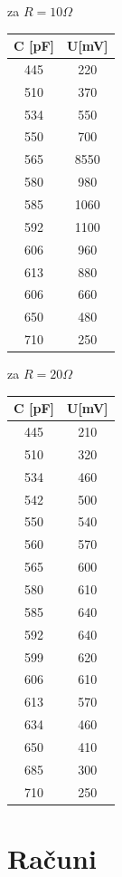 \documentclass[a4paper]{report}
\begin{document}
za $R = 10 \Omega$
\begin{center}
	\begin{tabular}{ |c|c| } 
 \hline
 C [pF] & U[mV] \\
 \hline
 	445   & 220 \\
    510   & 370 \\
    534   & 550 \\
    550   & 700 \\
    565   & 8550 \\
    580   & 980 \\
    585   & 1060 \\
    592   & 1100 \\
    606   & 960 \\
    613   & 880 \\
    606   & 660 \\
    650   & 480 \\
    710   & 250 \\
 \hline
	\end{tabular}
\end{center}



za $R = 20\Omega$
\begin{center}
	\begin{tabular}{ |c|c| } 
 \hline
 C [pF] & U[mV] \\
 \hline
 	445   & 210 \\
    510   & 320 \\
    534   & 460 \\
    542   & 500 \\
    550   & 540 \\
    560   & 570 \\
    565   & 600 \\
    580   & 610 \\
    585   & 640 \\
    592   & 640 \\
    599   & 620 \\
    606   & 610 \\
    613   & 570 \\
    634   & 460 \\
    650   & 410 \\
    685   & 300 \\
    710   & 250 \\
 \hline
	\end{tabular}
\end{center}


\chapter*{Računi}
\end{document}
